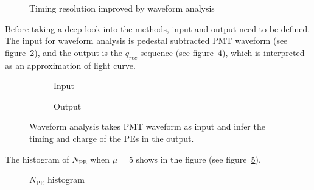 \begin{figure}[H]
    \centering
    \scalebox{0.5}{}
    \caption{\label{fig:reso-diff} Timing resolution improved by waveform analysis}
\end{figure}

Before taking a deep look into the methods, input and output need to be defined. The input for waveform analysis is pedestal subtracted PMT waveform (see figure~\ref{fig:input}), and the output is the $q_{rec}$ sequence (see figure~\ref{fig:output}), which is interpreted as an approximation of light curve. 

\begin{figure}[H]
  \begin{subfigure}{.5\textwidth}
    \centering
    \resizebox{\textwidth}{!}{}
    \caption{\label{fig:input} Input}
  \end{subfigure}
  \begin{subfigure}{.5\textwidth}
    \centering
    \resizebox{\textwidth}{!}{}
    \caption{\label{fig:output} Output}
  \end{subfigure}
  \caption{Waveform analysis takes PMT waveform as input and infer the timing and charge of the PEs in the output.}
\end{figure}

The histogram of $N_\mathrm{PE}$ when $\mu=5$ shows in the figure (see figure~\ref{fig:penum}). 

\begin{figure}[H]
    \centering
    \scalebox{0.4}{}
    \caption{\label{fig:penum} $N_\mathrm{PE}$ histogram}
\end{figure}


